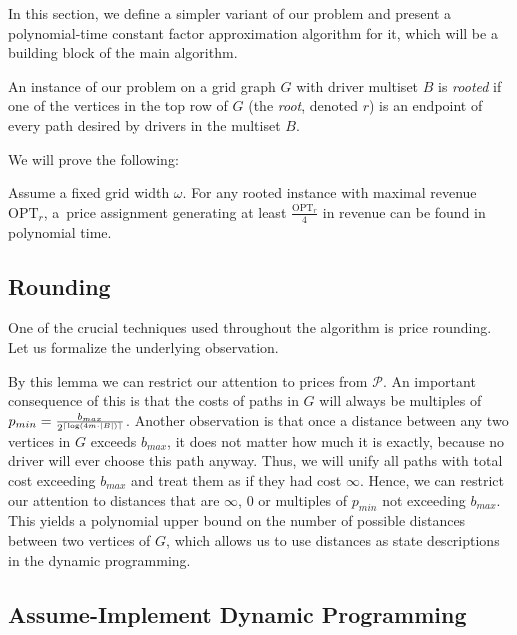 \label{sec:rooted}

\newcommand{\Crounding}{4}

In this section, we define a simpler variant of our problem and present a polynomial-time constant factor approximation algorithm for it, which will be a building block of the main algorithm.

\begin{definition}
    An instance of our problem on a grid graph $G$ with driver multiset $B$ is \emph{rooted} if one of the vertices in the top row of $G$ (the \emph{root}, denoted $r$) is an endpoint of every path desired by drivers in the multiset $B$.
\end{definition}

We will prove the following:

\begin{lemma}
\label{rooted_rev}
    Assume a fixed grid width $\omega$. For any rooted instance with maximal revenue $\mathrm{OPT}_r$, a~price assignment generating at least $\frac{\mathrm{OPT}_r}{\Crounding}$ in revenue can be found in polynomial time.
\end{lemma}

\subsection{Rounding}
\label{sect:rounding}

One of the crucial techniques used throughout the algorithm is price rounding.
Let us formalize the underlying observation.



By this lemma we can restrict our attention to prices from $\mathcal{P}$.
An important consequence of this is that the costs of paths in $G$ will always be multiples of
$p_{min} = \frac{b_{max}}{2^{\left\lceil \log \left( 4 m \cdot \left| B \right| \right) \right\rceil}}$.
Another observation is that once a distance between any two vertices in $G$ exceeds $b_{max}$, 
it does not matter how much it is exactly, because no driver will ever choose this path anyway.
Thus, we will unify all paths with total cost exceeding $b_{max}$ and treat them as if they had cost $\infty$.
Hence, we can restrict our attention to distances that are $\infty$, $0$ or multiples of $p_{min}$ not exceeding $b_{max}$.
This yields a polynomial upper bound on the number of possible distances between two vertices of $G$,
which allows us to use distances as state descriptions in the dynamic programming.

\subsection{Assume-Implement Dynamic Programming}

